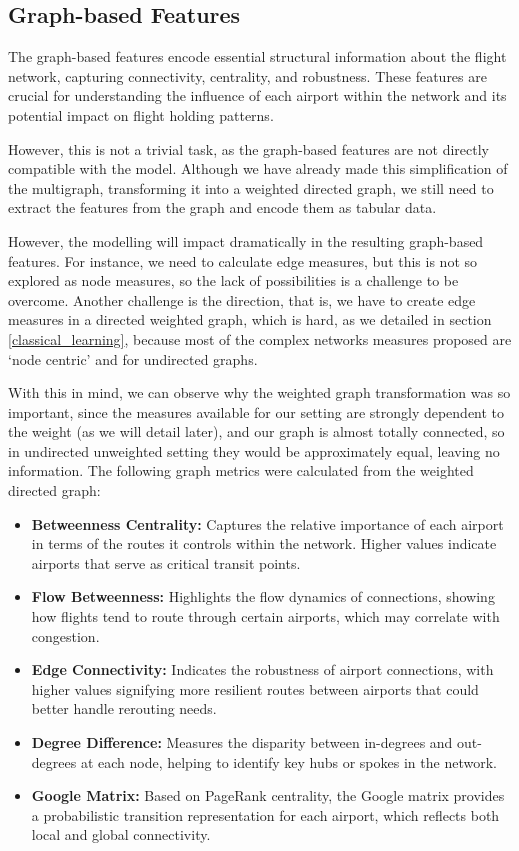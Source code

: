 




\subsection{Graph-based Features}
The graph-based features encode essential structural information about the flight network, capturing connectivity, centrality, and robustness. These features are crucial for understanding the influence of each airport within the network and its potential impact on flight holding patterns. 

However, this is not a trivial task, as the graph-based features are not directly compatible with the model. Although we have already made this simplification of the multigraph, transforming it into a weighted directed graph, we still need to extract the features from the graph and encode them as tabular data. 

However, the modelling will impact dramatically in the resulting graph-based features. For instance, we need to calculate edge measures, but this is not so explored as node measures, so the lack of possibilities is a challenge to be overcome.  Another challenge is the direction, that is, we have to create edge measures in a directed weighted graph, which is hard, as we detailed in section \ref{classical_learning}, because most of the complex networks measures proposed are `node centric' and for undirected graphs.

With this in mind, we can observe why the weighted graph transformation was so important, since the measures available for our setting are strongly dependent to the weight (as we will detail later), and our graph is almost totally connected, so in undirected unweighted setting they would be approximately equal, leaving no information. The following graph metrics were calculated from the weighted directed graph:

\begin{itemize}
    \item \textbf{Betweenness Centrality:} Captures the relative importance of each airport in terms of the routes it controls within the network. Higher values indicate airports that serve as critical transit points.
    \item \textbf{Flow Betweenness:} Highlights the flow dynamics of connections, showing how flights tend to route through certain airports, which may correlate with congestion.
    \item \textbf{Edge Connectivity:} Indicates the robustness of airport connections, with higher values signifying more resilient routes between airports that could better handle rerouting needs.
    \item \textbf{Degree Difference:} Measures the disparity between in-degrees and out-degrees at each node, helping to identify key hubs or spokes in the network.
    \item \textbf{Google Matrix:} Based on PageRank centrality, the Google matrix provides a probabilistic transition representation for each airport, which reflects both local and global connectivity.
\end{itemize}


